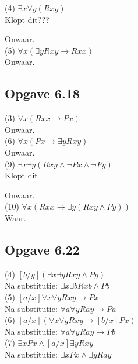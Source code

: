 \documentclass[11pt]{article}
\newcommand{\E}{\exists}
\newcommand{\A}{\forall}
\begin{document}
  (4) $\E x \A y(Rxy)$ \\

  Klopt dit???

  Onwaar. \\

  (5) $\A x(\E y Rxy \rightarrow Rxx)$ \\

  Onwaar. \\


  \subsection*{Opgave 6.18}

  (3) $\A x(Rxx \rightarrow Px)$ \\

  Onwaar. \\

  (6) $\A x(Px \rightarrow \E y Rxy)$ \\

  Onwaar. \\

  (9) $\E x \E y(Rxy \wedge \neg Px \wedge \neg Py)$ \\

  Klopt dit

  Onwaar. \\

  (10) $\A x(Rxx \rightarrow \E y(Rxy \wedge Py))$ \\

  Waar. \\


  \subsection*{Opgave 6.22}


  (4) $[b/y](\E x \E y Rxy \wedge Py)$ \\

  Na substitutie: $\E x \E b Rxb \wedge Pb$ \\

  (5) $[a/x] \A x \A y Rxy \rightarrow Px$ \\

  Na substitutie: $\A a \A y Ray \rightarrow Pa$ \\

  (6) $[a/x] (\A x \A y Rxy \rightarrow [b/x]Px)$ \\

  Na substitutie: $\A a \A y Ray \rightarrow Pb$ \\

  (7) $\E x Px \wedge [a/x] \E y Rxy$ \\

  Na substitutie: $\E x Px \wedge \E y Ray$ \\
\end{document}

